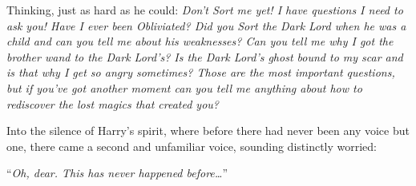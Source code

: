 Thinking, just as hard as he could: \emph{Don’t Sort me yet! I have questions I need to ask you! Have I ever been Obliviated? Did you Sort the Dark Lord when he was a child and can you tell me about his weaknesses? Can you tell me why I got the brother wand to the Dark Lord’s? Is the Dark Lord’s ghost bound to my scar and is that why I get so angry sometimes? Those are the most important questions, but if you’ve got another moment can you tell me anything about how to rediscover the lost magics that created you?}

Into the silence of Harry’s spirit, where before there had never been any voice but one, there came a second and unfamiliar voice, sounding distinctly worried:

“\emph{Oh, dear. This has never happened before…}”

